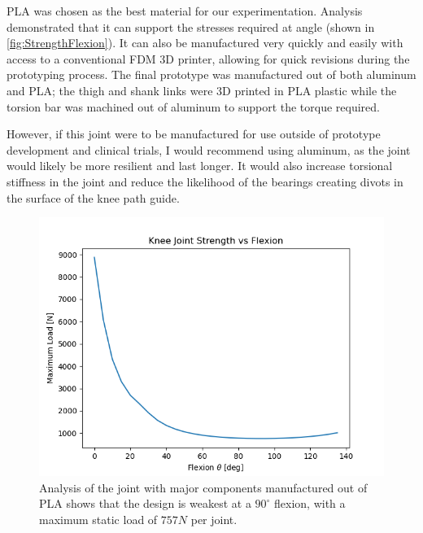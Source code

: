 
PLA was chosen as the best material for our experimentation. Analysis demonstrated that it can support the stresses required at angle (shown in \autoref{fig:StrengthFlexion}). It can also be manufactured very quickly and easily with access to a conventional FDM 3D printer, allowing for quick revisions during the prototyping process. The final prototype was manufactured out of both aluminum and PLA; the thigh and shank links were 3D printed in PLA plastic while the torsion bar was machined out of aluminum to support the torque required.

However, if this joint were to be manufactured for use outside of prototype development and clinical trials, I would recommend using aluminum, as the joint would likely be more resilient and last longer. It would also increase torsional stiffness in the joint and reduce the likelihood of the bearings creating divots in the surface of the knee path guide.

\begin{figure}[ht!]
    \centering
    \includegraphics[width=0.8\linewidth]{Figures/Design/StrengthFlexionCurve.png}
    \caption{Analysis of the joint with major components manufactured out of PLA shows that the design is weakest at a \(90^\circ\) flexion, with a maximum static load of \(757N\) per joint.}
    \label{fig:StrengthFlexion}
\end{figure}

